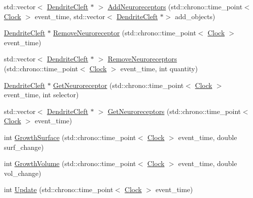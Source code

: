 \begin{DoxyCompactItemize}
\item 
std\+::vector$<$ \hyperlink{class_dendrite_cleft}{Dendrite\+Cleft} $\ast$ $>$ \hyperlink{class_dendrite_cleft_a6d29f577ff12366f8f51804b13468395}{Add\+Neuroreceptors} (std\+::chrono\+::time\+\_\+point$<$ \hyperlink{universe_8h_a0ef8d951d1ca5ab3cfaf7ab4c7a6fd80}{Clock} $>$ event\+\_\+time, std\+::vector$<$ \hyperlink{class_dendrite_cleft}{Dendrite\+Cleft} $\ast$$>$ add\+\_\+objects)
\item 
\hyperlink{class_dendrite_cleft}{Dendrite\+Cleft} $\ast$ \hyperlink{class_dendrite_cleft_afaf06d4516355dfe2e0e4c33a00f0f1d}{Remove\+Neuroreceptor} (std\+::chrono\+::time\+\_\+point$<$ \hyperlink{universe_8h_a0ef8d951d1ca5ab3cfaf7ab4c7a6fd80}{Clock} $>$ event\+\_\+time)
\item 
std\+::vector$<$ \hyperlink{class_dendrite_cleft}{Dendrite\+Cleft} $\ast$ $>$ \hyperlink{class_dendrite_cleft_ac29b12d4abcc47fa298ab9e95f578f0e}{Remove\+Neuroreceptors} (std\+::chrono\+::time\+\_\+point$<$ \hyperlink{universe_8h_a0ef8d951d1ca5ab3cfaf7ab4c7a6fd80}{Clock} $>$ event\+\_\+time, int quantity)
\item 
\hyperlink{class_dendrite_cleft}{Dendrite\+Cleft} $\ast$ \hyperlink{class_dendrite_cleft_a5eb3a8f143f63b852b8f5e245d385519}{Get\+Neuroreceptor} (std\+::chrono\+::time\+\_\+point$<$ \hyperlink{universe_8h_a0ef8d951d1ca5ab3cfaf7ab4c7a6fd80}{Clock} $>$ event\+\_\+time, int selector)
\item 
std\+::vector$<$ \hyperlink{class_dendrite_cleft}{Dendrite\+Cleft} $\ast$ $>$ \hyperlink{class_dendrite_cleft_a4a14361574777fb1d66fd4ed2d4f2492}{Get\+Neuroreceptors} (std\+::chrono\+::time\+\_\+point$<$ \hyperlink{universe_8h_a0ef8d951d1ca5ab3cfaf7ab4c7a6fd80}{Clock} $>$ event\+\_\+time)
\item 
int \hyperlink{class_dendrite_cleft_af4715ffbf1bf437523d07e37b7abc3e0}{Growth\+Surface} (std\+::chrono\+::time\+\_\+point$<$ \hyperlink{universe_8h_a0ef8d951d1ca5ab3cfaf7ab4c7a6fd80}{Clock} $>$ event\+\_\+time, double surf\+\_\+change)
\item 
int \hyperlink{class_dendrite_cleft_a0cb2fc6ad72bba55b5f65130006d4b12}{Growth\+Volume} (std\+::chrono\+::time\+\_\+point$<$ \hyperlink{universe_8h_a0ef8d951d1ca5ab3cfaf7ab4c7a6fd80}{Clock} $>$ event\+\_\+time, double vol\+\_\+change)
\item 
int \hyperlink{class_dendrite_cleft_a3a75af4d6fd97c9635134509f170a04e}{Update} (std\+::chrono\+::time\+\_\+point$<$ \hyperlink{universe_8h_a0ef8d951d1ca5ab3cfaf7ab4c7a6fd80}{Clock} $>$ event\+\_\+time)
\end{DoxyCompactItemize}

